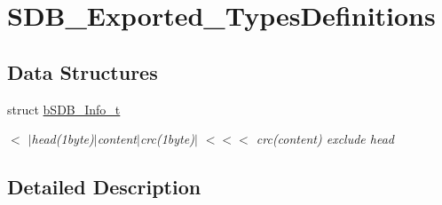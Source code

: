 \hypertarget{group___s_d_b___exported___types_definitions}{}\section{S\+D\+B\+\_\+\+Exported\+\_\+\+Types\+Definitions}
\label{group___s_d_b___exported___types_definitions}
\subsection*{Data Structures}
\begin{DoxyCompactItemize}
\item 
struct \mbox{\hyperlink{structb_s_d_b___info__t}{b\+S\+D\+B\+\_\+\+Info\+\_\+t}}
\begin{DoxyCompactList}\small\item\em $<$ $\vert$head(1byte)$\vert$content$\vert$crc(1byte)$\vert$ $<$$<$$<$ crc(content) exclude head \end{DoxyCompactList}\end{DoxyCompactItemize}


\subsection{Detailed Description}
